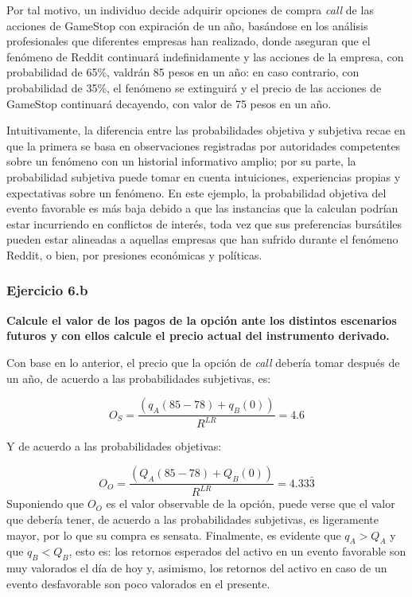 \documentclass[
]{article}
\begin{document}
Por tal motivo, un individuo decide adquirir opciones de compra
\emph{call} de las acciones de GameStop con expiración de un año,
basándose en los análisis profesionales que diferentes empresas han
realizado, donde aseguran que el fenómeno de Reddit continuará
indefinidamente y las acciones de la empresa, con probabilidad de 65\%,
valdrán 85 pesos en un año: en caso contrario, con probabilidad de 35\%,
el fenómeno se extinguirá y el precio de las acciones de GameStop
continuará decayendo, con valor de 75 pesos en un año.

Intuitivamente, la diferencia entre las probabilidades objetiva y
subjetiva recae en que la primera se basa en observaciones registradas
por autoridades competentes sobre un fenómeno con un historial
informativo amplio; por su parte, la probabilidad subjetiva puede tomar
en cuenta intuiciones, experiencias propias y expectativas sobre un
fenómeno. En este ejemplo, la probabilidad objetiva del evento favorable
es más baja debido a que las instancias que la calculan podrían estar
incurriendo en conflictos de interés, toda vez que sus preferencias
bursátiles pueden estar alineadas a aquellas empresas que han sufrido
durante el fenómeno Reddit, o bien, por presiones económicas y
políticas.

\hypertarget{ejercicio-6.b}{%
\subsubsection{Ejercicio 6.b}\label{ejercicio-6.b}}

\textbf{Calcule el valor de los pagos de la opción ante los distintos
escenarios futuros y con ellos calcule el precio actual del instrumento
derivado.}

Con base en lo anterior, el precio que la opción de \emph{call} debería
tomar después de un año, de acuerdo a las probabilidades subjetivas, es:

\[O_{S} = \frac{(q_{A}(85 - 78) + q_{B}(0))}{R^{LR}} = 4.6\]

Y de acuerdo a las probabilidades objetivas:

\[O_{O} = \frac{(Q_{A}(85 - 78) + Q_{B}(0))}{R^{LR}} = 4.33\bar{3}\]
Suponiendo que \(O_{O}\) es el valor observable de la opción, puede
verse que el valor que debería tener, de acuerdo a las probabilidades
subjetivas, es ligeramente mayor, por lo que su compra es sensata.
Finalmente, es evidente que \(q_{A} > Q_{A}\) y que \(q_{B} < Q_{B}\),
esto es: los retornos esperados del activo en un evento favorable son
muy valorados el día de hoy y, asimismo, los retornos del activo en caso
de un evento desfavorable son poco valorados en el presente.
\end{document}
